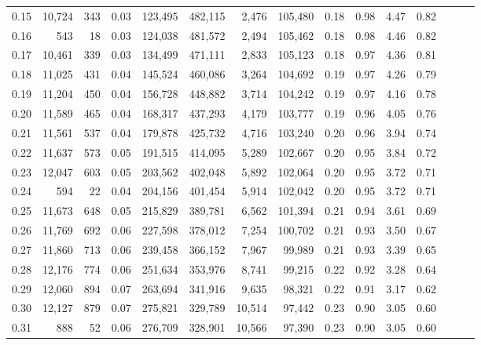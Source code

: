\begin{tabular}{rrrrrrrrrrrrrrr}
0.15 &  10,724 &    343 &  0.03 &  123,495 &  482,115 &    2,476 &  105,480 &  0.18 &  0.98 &  4.47 &      0.82 \\
0.16 &     543 &     18 &  0.03 &  124,038 &  481,572 &    2,494 &  105,462 &  0.18 &  0.98 &  4.46 &      0.82 \\
0.17 &  10,461 &    339 &  0.03 &  134,499 &  471,111 &    2,833 &  105,123 &  0.18 &  0.97 &  4.36 &      0.81 \\
0.18 &  11,025 &    431 &  0.04 &  145,524 &  460,086 &    3,264 &  104,692 &  0.19 &  0.97 &  4.26 &      0.79 \\
0.19 &  11,204 &    450 &  0.04 &  156,728 &  448,882 &    3,714 &  104,242 &  0.19 &  0.97 &  4.16 &      0.78 \\
0.20 &  11,589 &    465 &  0.04 &  168,317 &  437,293 &    4,179 &  103,777 &  0.19 &  0.96 &  4.05 &      0.76 \\
0.21 &  11,561 &    537 &  0.04 &  179,878 &  425,732 &    4,716 &  103,240 &  0.20 &  0.96 &  3.94 &      0.74 \\
0.22 &  11,637 &    573 &  0.05 &  191,515 &  414,095 &    5,289 &  102,667 &  0.20 &  0.95 &  3.84 &      0.72 \\
0.23 &  12,047 &    603 &  0.05 &  203,562 &  402,048 &    5,892 &  102,064 &  0.20 &  0.95 &  3.72 &      0.71 \\
0.24 &     594 &     22 &  0.04 &  204,156 &  401,454 &    5,914 &  102,042 &  0.20 &  0.95 &  3.72 &      0.71 \\
0.25 &  11,673 &    648 &  0.05 &  215,829 &  389,781 &    6,562 &  101,394 &  0.21 &  0.94 &  3.61 &      0.69 \\
0.26 &  11,769 &    692 &  0.06 &  227,598 &  378,012 &    7,254 &  100,702 &  0.21 &  0.93 &  3.50 &      0.67 \\
0.27 &  11,860 &    713 &  0.06 &  239,458 &  366,152 &    7,967 &   99,989 &  0.21 &  0.93 &  3.39 &      0.65 \\
0.28 &  12,176 &    774 &  0.06 &  251,634 &  353,976 &    8,741 &   99,215 &  0.22 &  0.92 &  3.28 &      0.64 \\
0.29 &  12,060 &    894 &  0.07 &  263,694 &  341,916 &    9,635 &   98,321 &  0.22 &  0.91 &  3.17 &      0.62 \\
0.30 &  12,127 &    879 &  0.07 &  275,821 &  329,789 &   10,514 &   97,442 &  0.23 &  0.90 &  3.05 &      0.60 \\
0.31 &     888 &     52 &  0.06 &  276,709 &  328,901 &   10,566 &   97,390 &  0.23 &  0.90 &  3.05 &      0.60 \\

\end{tabular}
